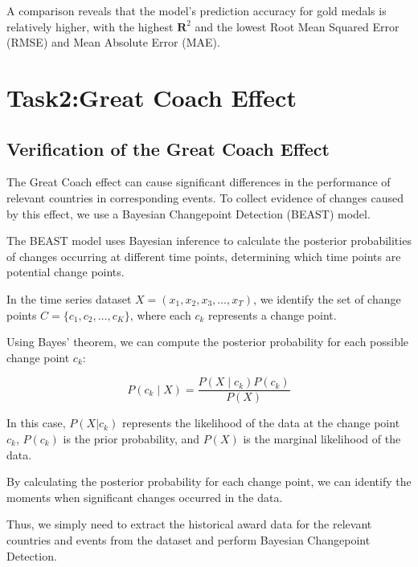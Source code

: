 \documentclass[12pt]{article}  %
\begin{document}
A comparison reveals that the model's prediction accuracy for gold medals is relatively higher, with the highest \(\mathbf{R}^2\) and the lowest Root Mean Squared Error (RMSE) and Mean Absolute Error (MAE).








\section{Task2:Great Coach Effect}
\subsection{Verification of the Great Coach Effect}
The Great Coach effect can cause significant differences in the performance of relevant countries in corresponding events. To collect evidence of changes caused by this effect, we use a Bayesian Changepoint Detection (BEAST) model.

The BEAST model uses Bayesian inference to calculate the posterior probabilities of changes occurring at different time points, determining which time points are potential change points.

In the time series dataset \(X = (x_1, x_2, x_3, \ldots, x_T)\), we identify the set of change points \(C = \{c_1, c_2, \ldots, c_K\}\), where each \(c_k\) represents a change point.

Using Bayes' theorem, we can compute the posterior probability for each possible change point $c_k$:

\begin{equation}
	P(c_k \mid X) = \frac{P(X \mid c_k) P(c_k)}{P(X)}
\end{equation}

In this case, \( P(X|c_k) \) represents the likelihood of the data at the change point \( c_k \), \( P(c_k) \) is the prior probability, and \( P(X) \) is the marginal likelihood of the data.

By calculating the posterior probability for each change point, we can identify the moments when significant changes occurred in the data.

Thus, we simply need to extract the historical award data for the relevant countries and events from the dataset and perform Bayesian Changepoint Detection.
\end{document}
